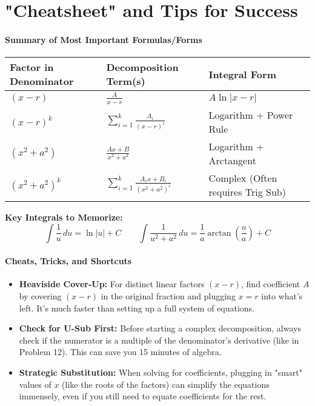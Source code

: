 \documentclass{article}
\begin{document}
\part{"Cheatsheet" and Tips for Success}
\subsection{Summary of Most Important Formulas/Forms}
\begin{center}
\begin{tabular}{|l|l|l|}
\hline
\textbf{Factor in Denominator} & \textbf{Decomposition Term(s)} & \textbf{Integral Form} \\
\hline
$(x-r)$ & $\displaystyle\frac{A}{x-r}$ & $A\ln|x-r|$ \\
\hline
$(x-r)^k$ & $\displaystyle\sum_{i=1}^k \frac{A_i}{(x-r)^i}$ & Logarithm + Power Rule \\
\hline
$(x^2+a^2)$ & $\displaystyle\frac{Ax+B}{x^2+a^2}$ & Logarithm + Arctangent \\
\hline
$(x^2+a^2)^k$ & $\displaystyle\sum_{i=1}^k \frac{A_ix+B_i}{(x^2+a^2)^i}$ & Complex (Often requires Trig Sub) \\
\hline
\end{tabular}
\end{center}
\textbf{Key Integrals to Memorize:}
\[ \int \frac{1}{u} \,du = \ln|u| + C \quad \quad \int \frac{1}{u^2+a^2} \,du = \frac{1}{a}\arctan\left(\frac{u}{a}\right) + C \]

\subsection{Cheats, Tricks, and Shortcuts}
\begin{itemize}
    \item \textbf{Heaviside Cover-Up:} For distinct linear factors $(x-r)$, find coefficient $A$ by covering $(x-r)$ in the original fraction and plugging $x=r$ into what's left. It's much faster than setting up a full system of equations.
    \item \textbf{Check for U-Sub First:} Before starting a complex decomposition, always check if the numerator is a multiple of the denominator's derivative (like in Problem 12). This can save you 15 minutes of algebra.
    \item \textbf{Strategic Substitution:} When solving for coefficients, plugging in "smart" values of $x$ (like the roots of the factors) can simplify the equations immensely, even if you still need to equate coefficients for the rest.
\end{itemize}
\end{document}
